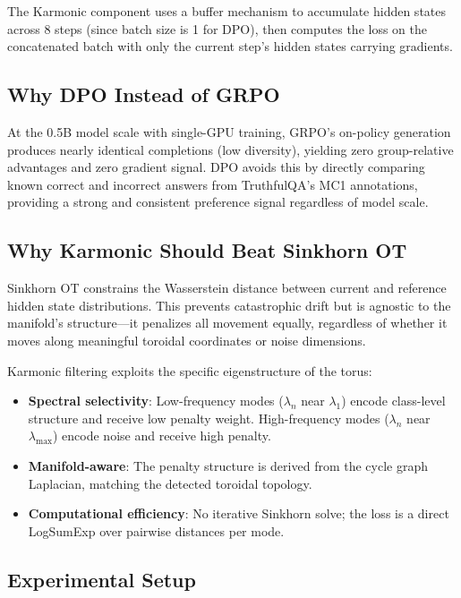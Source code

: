 \documentclass[11pt,a4paper]{article}
\begin{document}
The Karmonic component uses a buffer mechanism to accumulate hidden states across 8 steps (since batch size is 1 for DPO), then computes the loss on the concatenated batch with only the current step's hidden states carrying gradients.

\subsection{Why DPO Instead of GRPO}

At the 0.5B model scale with single-GPU training, GRPO's on-policy generation produces nearly identical completions (low diversity), yielding zero group-relative advantages and zero gradient signal. DPO avoids this by directly comparing known correct and incorrect answers from TruthfulQA's MC1 annotations, providing a strong and consistent preference signal regardless of model scale.

\subsection{Why Karmonic Should Beat Sinkhorn OT}

Sinkhorn OT constrains the Wasserstein distance between current and reference hidden state distributions. This prevents catastrophic drift but is agnostic to the manifold's structure---it penalizes all movement equally, regardless of whether it moves along meaningful toroidal coordinates or noise dimensions.

Karmonic filtering exploits the specific eigenstructure of the torus:
\begin{itemize}
    \item \textbf{Spectral selectivity}: Low-frequency modes ($\lambda_n$ near $\lambda_1$) encode class-level structure and receive low penalty weight. High-frequency modes ($\lambda_n$ near $\lambda_{\max}$) encode noise and receive high penalty.
    \item \textbf{Manifold-aware}: The penalty structure is derived from the cycle graph Laplacian, matching the detected toroidal topology.
    \item \textbf{Computational efficiency}: No iterative Sinkhorn solve; the loss is a direct LogSumExp over pairwise distances per mode.
\end{itemize}

\subsection{Experimental Setup}
\end{document}
